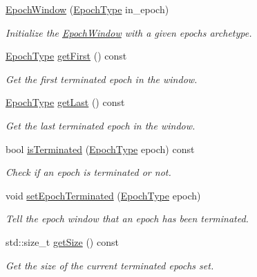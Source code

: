 \begin{DoxyCompactItemize}
\item 
\hyperlink{structvt_1_1epoch_1_1_epoch_window_ab0d58ee25bf04051ac80ff32a4fcd8e5}{Epoch\+Window} (\hyperlink{namespacevt_a985a5adf291c34a3ca263b3378388236}{Epoch\+Type} in\+\_\+epoch)
\begin{DoxyCompactList}\small\item\em Initialize the {\ttfamily \hyperlink{structvt_1_1epoch_1_1_epoch_window}{Epoch\+Window}} with a given epoch\textquotesingle{}s archetype. \end{DoxyCompactList}\item 
\hyperlink{namespacevt_a985a5adf291c34a3ca263b3378388236}{Epoch\+Type} \hyperlink{structvt_1_1epoch_1_1_epoch_window_ae9bbc46060c62f7adeac93620d4ae0fc}{get\+First} () const
\begin{DoxyCompactList}\small\item\em Get the first terminated epoch in the window. \end{DoxyCompactList}\item 
\hyperlink{namespacevt_a985a5adf291c34a3ca263b3378388236}{Epoch\+Type} \hyperlink{structvt_1_1epoch_1_1_epoch_window_a8105180308f26a76483992775e8b4da5}{get\+Last} () const
\begin{DoxyCompactList}\small\item\em Get the last terminated epoch in the window. \end{DoxyCompactList}\item 
bool \hyperlink{structvt_1_1epoch_1_1_epoch_window_a950c2b957d27d722e9fd311a7639c989}{is\+Terminated} (\hyperlink{namespacevt_a985a5adf291c34a3ca263b3378388236}{Epoch\+Type} epoch) const
\begin{DoxyCompactList}\small\item\em Check if an epoch is terminated or not. \end{DoxyCompactList}\item 
void \hyperlink{structvt_1_1epoch_1_1_epoch_window_a7dda8662e2956ec569b00827e863454a}{set\+Epoch\+Terminated} (\hyperlink{namespacevt_a985a5adf291c34a3ca263b3378388236}{Epoch\+Type} epoch)
\begin{DoxyCompactList}\small\item\em Tell the epoch window that an epoch has been terminated. \end{DoxyCompactList}\item 
std\+::size\+\_\+t \hyperlink{structvt_1_1epoch_1_1_epoch_window_ac264a0a8ab40a44eb18d8192663772f2}{get\+Size} () const
\begin{DoxyCompactList}\small\item\em Get the size of the current terminated epochs set. \end{DoxyCompactList}\item 

\end{DoxyCompactItemize}
